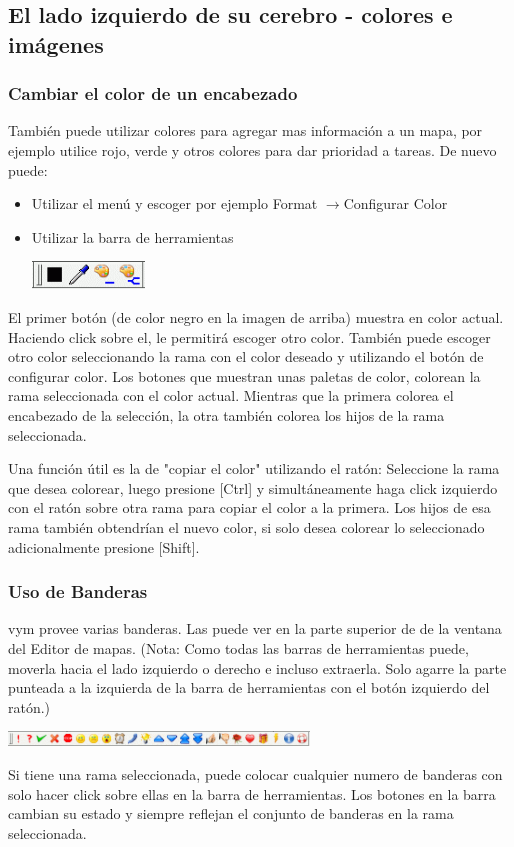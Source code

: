 \documentclass{article}
\newcommand{\vym}{{\sc vym }}
\newcommand{\ra}{$\longrightarrow$}
\newcommand{\key}[1]{[#1]}
\begin{document}
\subsection{El lado izquierdo de su cerebro - colores e im\'agenes}
\subsubsection*{Cambiar el color de un encabezado}
Tambi\'en puede utilizar colores para agregar mas informaci\'on a un mapa, por ejemplo utilice rojo, verde y otros colores para dar prioridad a tareas.  De nuevo puede:
\begin{itemize}
    \item Utilizar el men\'u y escoger por ejemplo Format \ra Configurar Color
    \item Utilizar la barra de herramientas
        \begin{center}
            \includegraphics[width=3cm]{images/color-buttons.png}
        \end{center}    
\end{itemize}
El primer bot\'on (de color negro en la imagen de arriba) muestra en color actual. Haciendo click sobre el, le permitir\'a escoger otro color. Tambi\'en puede escoger otro color seleccionando la rama con el color deseado y utilizando el bot\'on de configurar color. Los botones que muestran unas paletas de color, colorean la rama seleccionada con el color actual. Mientras que la primera colorea el encabezado de la selecci\'on, la otra tambi\'en colorea los hijos de la rama seleccionada.

Una funci\'on \'util es la de "copiar el color" utilizando el rat\'on: Seleccione la rama que desea colorear, luego presione \key{Ctrl} y simult\'aneamente haga click izquierdo con el rat\'on sobre otra rama para copiar el color a la primera. Los hijos de esa rama tambi\'en obtendr\'ian el nuevo color, si solo desea colorear lo seleccionado adicionalmente presione \key{Shift}.

\subsubsection*{Uso de Banderas}
\vym provee varias banderas. Las puede ver en la parte superior de de la ventana del Editor de mapas. (Nota: Como todas las barras de herramientas puede, moverla hacia el lado izquierdo o derecho e incluso extraerla. Solo agarre la parte punteada a la izquierda de la barra de herramientas con el bot\'on izquierdo del rat\'on.)
\begin{center}
    \includegraphics[width=8cm]{images/default-flags.png}
\end{center}
Si tiene una rama seleccionada, puede colocar cualquier numero de banderas con solo hacer click sobre ellas en la barra de herramientas. Los botones en la barra cambian su estado y siempre reflejan el conjunto de banderas en la rama seleccionada.
\end{document}

